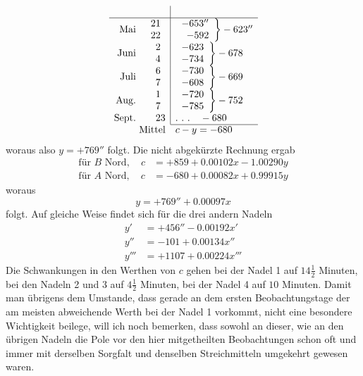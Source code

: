 \[
\begin{array}{rr|l}
&&\\\hline
\text{Mai}&\begin{array}{r}21\\22\end{array}&\left.\begin{array}{r}-653''\\-592\end{array}\right\}-623''\\
\text{Juni}&\begin{array}{r}2\\4\end{array}&\left.\begin{array}{r}-623\\-734\end{array}\right\}-678\\
\text{Juli}&\begin{array}{r}6\\7\end{array}&\left.\begin{array}{r}-730\\-608\end{array}\right\}-669\\
\text{Aug.}&\begin{array}{r}1\\7\end{array}&\left.\begin{array}{r}-720\\-785\end{array}\right\}-752\\
\text{Sept.}&23&.\ .\ .\quad-680\\\cline{3-3}
\multicolumn{2}{r}{\text{Mittel}}&c-y=-680
\end{array}
\]
woraus also $y=+769''$ folgt. Die nicht abgekürzte Rechnung ergab
\[
\begin{aligned}
\text{für }B\text{ Nord},\quad c&=+859+0.00102x-1.00290y\\
\text{für }A\text{ Nord},\quad c&=-680+0.00082x+0.99915y
\end{aligned}
\]
woraus
\[
y=+769''+0.00097x
\]
folgt. Auf gleiche Weise findet sich für die drei andern Nadeln
\[
\begin{aligned}
y'&=+456''-0.00192x'\\
y''&=-101+0.00134x''\\
y'''&=+1107+0.00224x'''
\end{aligned}
\]
Die Schwankungen in den Werthen von $c$ gehen bei der Nadel 1 auf $14\frac12$ Minuten, bei den Nadeln 2 und 3 auf $4\frac12$ Minuten, bei der Nadel 4 auf $10$ Minuten. Damit man übrigens dem Umstande, dass gerade an dem ersten Beobachtungstage der am meisten abweichende Werth bei der Nadel 1 vorkommt, nicht eine besondere Wichtigkeit beilege, will ich noch bemerken, dass sowohl an dieser, wie an den übrigen Nadeln die Pole vor den hier mitgetheilten Beobachtungen schon oft und immer mit derselben Sorgfalt und denselben Streichmitteln umgekehrt gewesen waren.


